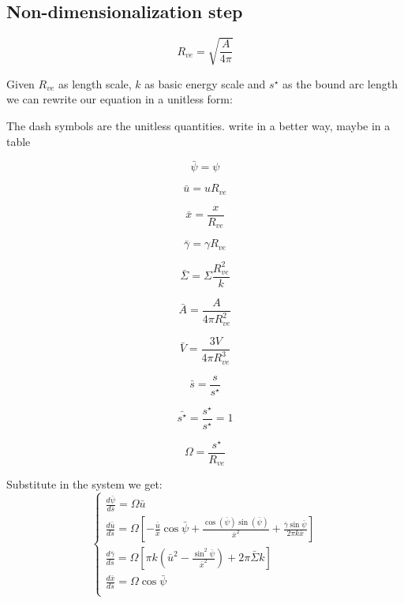 \documentclass[12pt]{article}
\begin{document}




\subsection{Non-dimensionalization step}
$$
R_{ve} = \sqrt{\frac{A}{4 \pi}}
$$

Given $R_{ve}$ as length scale, $k$ as basic energy scale and $s^\star$ as the bound arc length we can rewrite our equation in a unitless form:

The dash symbols are the unitless quantities.
\alert{write in a better way, maybe in a table}


$$
\bar{\psi} = \psi
$$

$$
\bar{u} = u R_{ve}
$$

$$
\bar{x} = \frac{x}{R_{ve}}
$$

$$
\bar{\gamma} = \gamma R_{ve}
$$

$$
\bar{\Sigma} = \Sigma \frac{R_{ve}^2}{k}
$$

$$
\bar{A} = \frac{A}{4 \pi R_{ve}^2 }
$$

$$
\bar{V} = \frac{3V}{4 \pi R_{ve}^3 }
$$

$$
\bar{s} = \frac{s}{s^\star}
$$

$$
\bar{s^\star} = \frac{s^\star}{s^\star} = 1
$$

$$
\Omega = \frac{s^\star}{R_{ve}}
$$
 

Substitute in the system we get:
\begin{equation}
  \begin{cases} 
    
    \frac{d\bar{\psi}}{d\bar{s}} = \Omega \bar{u} \\[3mm]
    \frac{d\bar{u}}{d\bar{s}} = \Omega [-\frac{\bar{u}}{\bar{x}}\cos\bar{\psi}+\frac{\cos(\bar{\psi})\sin(\bar{\psi})}{\bar{x}^2}+\frac{\bar{\gamma}\sin \bar{\psi}}{2\pi k \bar{x}}] \\[3mm]
    \frac{d\bar{\gamma}}{d\bar{s}} = \Omega [\pi k (\bar{u}^2-\frac{\sin^2 \bar{\psi}}{\bar{x}^2})+2 \pi \bar{\Sigma} k] \\[3mm]
    \frac{d\bar{x}}{d\bar{s}} = \Omega \cos \bar{\psi} \\[3mm]
  \end{cases}
\end{equation}
\end{document}
